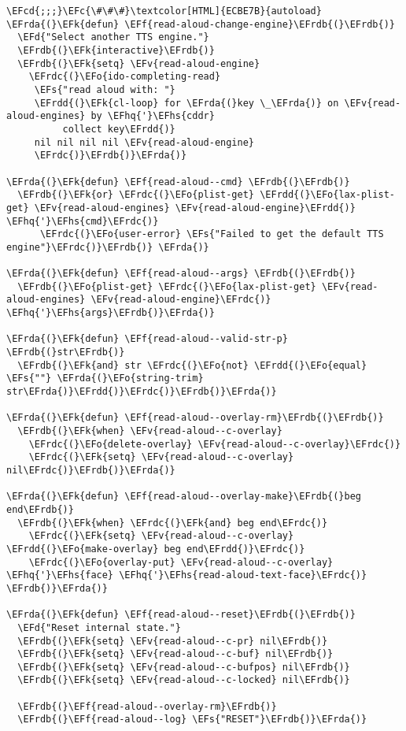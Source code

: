 \documentclass[a4wide,10pt]{article}
\newcommand{\EFc}[1]{\textcolor{EFc}{#1}} %
\newcommand{\EFcd}[1]{\textcolor{EFcd}{#1}} %
\newcommand{\EFs}[1]{\textcolor{EFs}{#1}} %
\newcommand{\EFd}[1]{\textcolor{EFd}{#1}} %
\newcommand{\EFk}[1]{\textcolor{EFk}{#1}} %
\newcommand{\EFf}[1]{\textcolor{EFf}{#1}} %
\newcommand{\EFv}[1]{\textcolor{EFv}{#1}} %
\newcommand{\EFo}[1]{\textcolor{EFo}{#1}} %
\newcommand{\EFhq}[1]{\textcolor{EFhq}{#1}} %
\newcommand{\EFhs}[1]{\textcolor{EFhs}{#1}} %
\newcommand{\EFrda}[1]{\textcolor{EFrda}{#1}} %
\newcommand{\EFrdb}[1]{\textcolor{EFrdb}{#1}} %
\newcommand{\EFrdc}[1]{\textcolor{EFrdc}{#1}} %
\newcommand{\EFrdd}[1]{\textcolor{EFrdd}{#1}} %
\begin{document}
\begin{Code}
\begin{Verbatim}
\EFcd{;;;}\EFc{\#\#\#}\textcolor[HTML]{ECBE7B}{autoload}
\EFrda{(}\EFk{defun} \EFf{read-aloud-change-engine}\EFrdb{(}\EFrdb{)}
  \EFd{"Select another TTS engine."}
  \EFrdb{(}\EFk{interactive}\EFrdb{)}
  \EFrdb{(}\EFk{setq} \EFv{read-aloud-engine}
	\EFrdc{(}\EFo{ido-completing-read}
	 \EFs{"read aloud with: "}
	 \EFrdd{(}\EFk{cl-loop} for \EFrda{(}key \_\EFrda{)} on \EFv{read-aloud-engines} by \EFhq{'}\EFhs{cddr}
		  collect key\EFrdd{)}
	 nil nil nil nil \EFv{read-aloud-engine}
	 \EFrdc{)}\EFrdb{)}\EFrda{)}

\EFrda{(}\EFk{defun} \EFf{read-aloud--cmd} \EFrdb{(}\EFrdb{)}
  \EFrdb{(}\EFk{or} \EFrdc{(}\EFo{plist-get} \EFrdd{(}\EFo{lax-plist-get} \EFv{read-aloud-engines} \EFv{read-aloud-engine}\EFrdd{)} \EFhq{'}\EFhs{cmd}\EFrdc{)}
      \EFrdc{(}\EFo{user-error} \EFs{"Failed to get the default TTS engine"}\EFrdc{)}\EFrdb{)} \EFrda{)}

\EFrda{(}\EFk{defun} \EFf{read-aloud--args} \EFrdb{(}\EFrdb{)}
  \EFrdb{(}\EFo{plist-get} \EFrdc{(}\EFo{lax-plist-get} \EFv{read-aloud-engines} \EFv{read-aloud-engine}\EFrdc{)} \EFhq{'}\EFhs{args}\EFrdb{)}\EFrda{)}

\EFrda{(}\EFk{defun} \EFf{read-aloud--valid-str-p} \EFrdb{(}str\EFrdb{)}
  \EFrdb{(}\EFk{and} str \EFrdc{(}\EFo{not} \EFrdd{(}\EFo{equal} \EFs{""} \EFrda{(}\EFo{string-trim} str\EFrda{)}\EFrdd{)}\EFrdc{)}\EFrdb{)}\EFrda{)}

\EFrda{(}\EFk{defun} \EFf{read-aloud--overlay-rm}\EFrdb{(}\EFrdb{)}
  \EFrdb{(}\EFk{when} \EFv{read-aloud--c-overlay}
    \EFrdc{(}\EFo{delete-overlay} \EFv{read-aloud--c-overlay}\EFrdc{)}
    \EFrdc{(}\EFk{setq} \EFv{read-aloud--c-overlay} nil\EFrdc{)}\EFrdb{)}\EFrda{)}

\EFrda{(}\EFk{defun} \EFf{read-aloud--overlay-make}\EFrdb{(}beg end\EFrdb{)}
  \EFrdb{(}\EFk{when} \EFrdc{(}\EFk{and} beg end\EFrdc{)}
    \EFrdc{(}\EFk{setq} \EFv{read-aloud--c-overlay} \EFrdd{(}\EFo{make-overlay} beg end\EFrdd{)}\EFrdc{)}
    \EFrdc{(}\EFo{overlay-put} \EFv{read-aloud--c-overlay} \EFhq{'}\EFhs{face} \EFhq{'}\EFhs{read-aloud-text-face}\EFrdc{)} \EFrdb{)}\EFrda{)}

\EFrda{(}\EFk{defun} \EFf{read-aloud--reset}\EFrdb{(}\EFrdb{)}
  \EFd{"Reset internal state."}
  \EFrdb{(}\EFk{setq} \EFv{read-aloud--c-pr} nil\EFrdb{)}
  \EFrdb{(}\EFk{setq} \EFv{read-aloud--c-buf} nil\EFrdb{)}
  \EFrdb{(}\EFk{setq} \EFv{read-aloud--c-bufpos} nil\EFrdb{)}
  \EFrdb{(}\EFk{setq} \EFv{read-aloud--c-locked} nil\EFrdb{)}

  \EFrdb{(}\EFf{read-aloud--overlay-rm}\EFrdb{)}
  \EFrdb{(}\EFf{read-aloud--log} \EFs{"RESET"}\EFrdb{)}\EFrda{)}


\end{Verbatim}
\end{Code}
\end{document}
